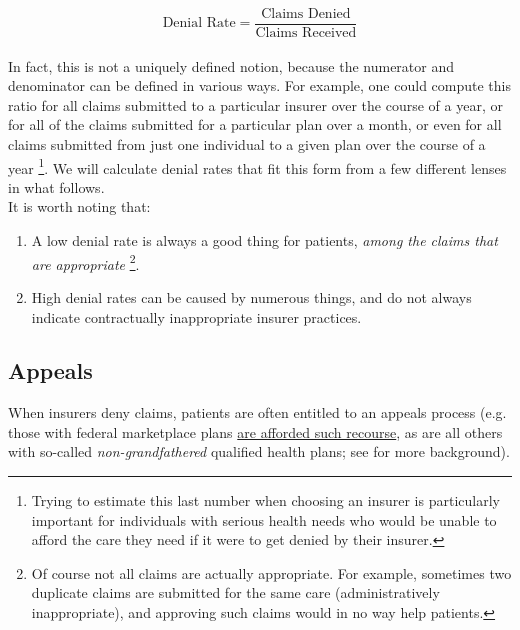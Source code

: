 \documentclass[psamsfonts]{amsart}
\theoremstyle{plain}
\theoremstyle{definition}
\theoremstyle{remark}
\begin{document}
\begin{equation*}
	\text{Denial Rate} = \dfrac{\text{Claims Denied}}{\text{Claims Received}}
\end{equation*}
\hfill\\
In fact, this is not a uniquely defined notion, because the numerator and denominator can be defined in various ways. For example, one could compute this ratio for all claims submitted to a particular insurer over the course of a year, or for all of the claims submitted for a particular plan over a month, or even for all claims submitted from just one individual to a given plan over the course of a year \footnote{Trying to estimate this last number when choosing an insurer is particularly important for individuals with serious health needs who would be unable to afford the care they need if it were to get denied by their insurer.}. We will calculate denial rates that fit this form from a few different lenses in what follows.\\

It is worth noting that:

\begin{enumerate}
\item A low denial rate is always a good thing for patients, \emph{among the claims that are appropriate} \footnote{Of course not all claims are actually appropriate. For example, sometimes two duplicate claims are submitted for the same care (administratively inappropriate), and approving such claims would in no way help patients. }.
\item High denial rates can be caused by numerous things, and do not always indicate contractually inappropriate insurer practices.
\end{enumerate}


\subsection{Appeals}

When insurers deny claims, patients are often entitled to an appeals process (e.g. those with federal marketplace plans \href{https://www.healthcare.gov/appeal-insurance-company-decision/appeals/}{are afforded such recourse}, as are all others with so-called \emph{non-grandfathered} qualified health plans; see \cite{pollitz2021} for more background).\\
\end{document}
